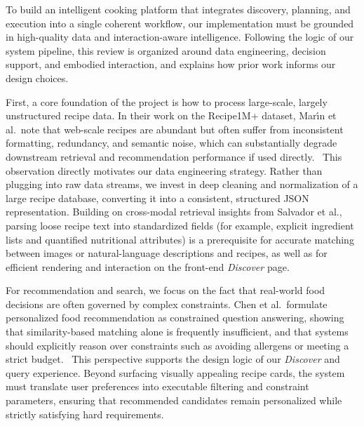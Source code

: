 \documentclass[sigconf]{acmart}
\begin{document}
To build an intelligent cooking platform that integrates discovery, planning, and execution into a single coherent workflow, our implementation must be grounded in high-quality data and interaction-aware intelligence. Following the logic of our system pipeline, this review is organized around data engineering, decision support, and embodied interaction, and explains how prior work informs our design choices.

First, a core foundation of the project is how to process large-scale, largely unstructured recipe data. In their work on the Recipe1M+ dataset, Mar{\'{\i}}n et al.\ note that web-scale recipes are abundant but often suffer from inconsistent formatting, redundancy, and semantic noise, which can substantially degrade downstream retrieval and recommendation performance if used directly.\ \cite{marin2021recipe1mplus} This observation directly motivates our data engineering strategy. Rather than plugging into raw data streams, we invest in deep cleaning and normalization of a large recipe database, converting it into a consistent, structured JSON representation. Building on cross-modal retrieval insights from Salvador et al., parsing loose recipe text into standardized fields (for example, explicit ingredient lists and quantified nutritional attributes) is a prerequisite for accurate matching between images or natural-language descriptions and recipes, as well as for efficient rendering and interaction on the front-end \textit{Discover} page.\ \cite{salvador2017learning_crossmodal}

For recommendation and search, we focus on the fact that real-world food decisions are often governed by complex constraints. Chen et al.\ formulate personalized food recommendation as constrained question answering, showing that similarity-based matching alone is frequently insufficient, and that systems should explicitly reason over constraints such as avoiding allergens or meeting a strict budget.\ \cite{chen2021personalized_food_kbqa} This perspective supports the design logic of our \textit{Discover} and query experience. Beyond surfacing visually appealing recipe cards, the system must translate user preferences into executable filtering and constraint parameters, ensuring that recommended candidates remain personalized while strictly satisfying hard requirements.
\end{document}
